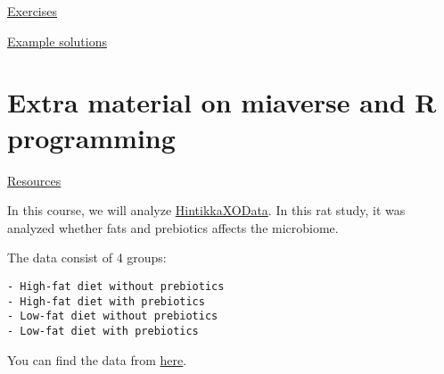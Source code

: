 \documentclass[
  oneside]{book}
\begin{document}
\href{https://microbiome.github.io/OMA/exercises.html}{Exercises}

\href{https://github.com/microbiome/course_2022_oulu/blob/main/example_solutions.Rmd}{Example solutions}

\hypertarget{extra-material-on-miaverse-and-r-programming}{%
\section{Extra material on miaverse and R programming}\label{extra-material-on-miaverse-and-r-programming}}

\href{https://microbiome.github.io/OMA/resources.html}{Resources}

In this course, we will analyze \href{https://rdrr.io/github/microbiome/microbiomeDataSets/man/HintikkaXOData.html}{HintikkaXOData}.
In this rat study, it was analyzed whether fats and prebiotics affects the microbiome.

The data consist of 4 groups:

\begin{verbatim}
- High-fat diet without prebiotics
- High-fat diet with prebiotics
- Low-fat diet without prebiotics
- Low-fat diet with prebiotics
\end{verbatim}

You can find the data from \href{https://github.com/microbiome/course_2022_oulu/tree/main/data}{here}.

  
\end{document}
